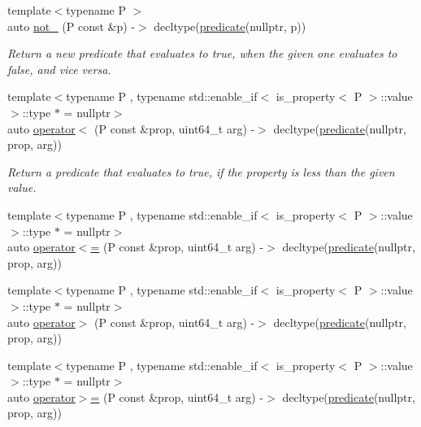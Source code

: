 \begin{DoxyCompactItemize}
{\footnotesize template$<$typename P $>$ }\\auto \hyperlink{namespacepfq_1_1lang_aad91ae49c0ddea5a9219f679e8de212a}{not\+\_\+} (P const \&p) -\/$>$ decltype(\hyperlink{namespacepfq_1_1lang_aca9adafc436b7f851621b979fa1aaf88}{predicate}(nullptr, p))
\begin{DoxyCompactList}\small\item\em Return a new predicate that evaluates to true, when the given one evaluates to false, and vice versa. \end{DoxyCompactList}\item 
{\footnotesize template$<$typename P , typename std\+::enable\+\_\+if$<$ is\+\_\+property$<$ P $>$\+::value $>$\+::type $\ast$  = nullptr$>$ }\\auto \hyperlink{namespacepfq_1_1lang_aa358821bfd1326e552c69635b969835d}{operator$<$} (P const \&prop, uint64\+\_\+t arg) -\/$>$ decltype(\hyperlink{namespacepfq_1_1lang_aca9adafc436b7f851621b979fa1aaf88}{predicate}(nullptr, prop, arg))
\begin{DoxyCompactList}\small\item\em Return a predicate that evaluates to {\ttfamily true}, if the property is less than the given value. \end{DoxyCompactList}\item 
{\footnotesize template$<$typename P , typename std\+::enable\+\_\+if$<$ is\+\_\+property$<$ P $>$\+::value $>$\+::type $\ast$  = nullptr$>$ }\\auto \hyperlink{namespacepfq_1_1lang_a039a937311f139f9a6e84c49c6505c70}{operator$<$=} (P const \&prop, uint64\+\_\+t arg) -\/$>$ decltype(\hyperlink{namespacepfq_1_1lang_aca9adafc436b7f851621b979fa1aaf88}{predicate}(nullptr, prop, arg))
\item 
{\footnotesize template$<$typename P , typename std\+::enable\+\_\+if$<$ is\+\_\+property$<$ P $>$\+::value $>$\+::type $\ast$  = nullptr$>$ }\\auto \hyperlink{namespacepfq_1_1lang_a708ca1f29e8dd2461859c46369e89322}{operator$>$} (P const \&prop, uint64\+\_\+t arg) -\/$>$ decltype(\hyperlink{namespacepfq_1_1lang_aca9adafc436b7f851621b979fa1aaf88}{predicate}(nullptr, prop, arg))
\item 
{\footnotesize template$<$typename P , typename std\+::enable\+\_\+if$<$ is\+\_\+property$<$ P $>$\+::value $>$\+::type $\ast$  = nullptr$>$ }\\auto \hyperlink{namespacepfq_1_1lang_a8278e1cf39622e9eb4859f4720da1d16}{operator$>$=} (P const \&prop, uint64\+\_\+t arg) -\/$>$ decltype(\hyperlink{namespacepfq_1_1lang_aca9adafc436b7f851621b979fa1aaf88}{predicate}(nullptr, prop, arg))

\end{DoxyCompactItemize}
